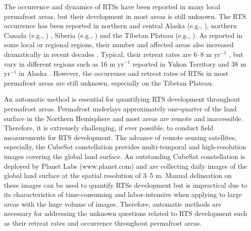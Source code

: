 \documentclass[authoryear,preprint,review,12pt]{elsarticle}
\begin{document}
The occurrence and dynamics of RTSs have been reported in many local permafrost areas, but their development in most areas is still unknown. 
The RTS occurrence has been reported in northern and central Alaska (e.g., \citealp{swanson2018growth,balser2014timing}), northern Canada (e.g., \citealp{burn1990canadian, cassidy2017impacts, armstrong2018thaw,lewkowicz2019extremes}) , Siberia (e.g., \citealp{leibman2003dynamics, zwieback2018sub}) and the Tibetan Plateau (e.g., \citealp{niu2005engineering, niu2016thaw}). 
As reported in some local or regional regions, their number and affected areas also increased dramatically in recent decades \citep{luo2019recent, lewkowicz2019extremes}.
Typical, their retreat rates are 6--8 m yr$^{-1}$ \citep{jorgenson_thermokarst_2013}, but vary in different regions such as 16 m yr$^{-1}$ reported in Yukon Territory \citep{burn1989geomorphology} and 38 m yr$^{-1}$  in Alaska \citep{swanson2018growth}.
However, the occurrence and retreat rates of RTSs in most permafrost areas are still unknown, especially on the Tibetan Plateau. 

An automatic method is essential for quantifying RTS development throughout permafrost areas. 
Permafrost underlays approximately one-quarter of the land surface in the Northern Hemisphere \citep{zhang1999statistics} and most areas are remote and inaccessible. 
Therefore, it is extremely challenging, if ever possible, to conduct field measurements for RTS development. 
The advance of remote sensing satellites, especially, the CubeSat constellation provides multi-temporal and high-resolution images covering the global land surface. 
An outstanding CubeSat constellation is deployed by Planet Labs (www.planet.com) and are collecting daily images of the global land surface at the spatial resolution of 3–5 m.
Manual delineation on these images can be used to quantify RTSs development but is impractical due to its characteristics of time-consuming and labor-intensive when applying to large areas with the huge volume of images. 
Therefore, automatic methods are necessary for addressing the unknown questions related to RTS development such as their retreat rates and occurrence throughout permafrost areas. 
\end{document}
